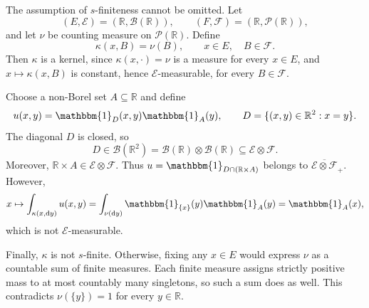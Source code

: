 \documentclass[11pt, a4paper, openany]{book}
\theoremstyle{definition}
\begin{document}
    The assumption of $s$-finiteness cannot be omitted. Let
    \[
        (E,\mathscr{E})=(\mathbb{R},\mathscr{B}(\mathbb{R})),
        \qquad
        (F,\mathscr{F})=(\mathbb{R},\mathscr{P}(\mathbb{R})),
    \]
    and let $\nu$ be counting measure on $\mathscr{P}(\mathbb{R})$. Define
    \[
        \kappa(x,B)=\nu(B),
        \qquad x\in E,\quad B\in\mathscr{F}.
    \]
    Then $\kappa$ is a kernel, since $\kappa(x,\cdot)=\nu$ is a measure
    for every $x\in E$, and $x\mapsto\kappa(x,B)$ is constant, hence
    $\mathscr{E}$-measurable, for every $B\in\mathscr{F}$.
    
    Choose a non-Borel set $A\subseteq\mathbb{R}$ and define
    \[
        u(x,y)=\mathbbm{1}_{D}(x,y)\mathbbm{1}_{A}(y),
        \qquad
        D=\{(x,y)\in\mathbb{R}^2:x=y\}.
    \]
    The diagonal $D$ is closed, so
    \[
        D\in\mathscr{B}(\mathbb{R}^2)
        =\mathscr{B}(\mathbb{R})\otimes\mathscr{B}(\mathbb{R})
        \subseteq\mathscr{E}\otimes\mathscr{F}.
    \]
    Moreover, $\mathbb{R}\times A\in\mathscr{E}\otimes\mathscr{F}$.
    Thus $u=\mathbbm{1}_{D\cap(\mathbb{R}\times A)}$ belongs to
    $\overline{\mathscr{E}\otimes\mathscr{F}}_+$. However,
    \[
        x\mapsto \int_{\kappa(x,\odif y)}u(x,y)
        =\int_{\nu(\odif y)}
            \mathbbm{1}_{\{x\}}(y)\mathbbm{1}_{A}(y)
        =\mathbbm{1}_{A}(x),
    \]
    which is not $\mathscr{E}$-measurable.
    
    Finally, $\kappa$ is not $s$-finite. Otherwise, fixing any $x\in E$
    would express $\nu$ as a countable sum of finite measures. Each
    finite measure assigns strictly positive mass to at most countably
    many singletons, so such a sum does as well. This contradicts
    $\nu(\{y\})=1$ for every $y\in\mathbb{R}$.
\end{document}
